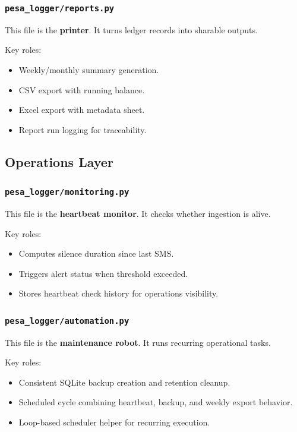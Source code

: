\documentclass[12pt,a4paper]{article}
\begin{document}
\subsubsection*{\texttt{pesa\_logger/reports.py}}
This file is the \textbf{printer}. It turns ledger records into sharable outputs.

Key roles:
\begin{itemize}[leftmargin=1.5em]
  \item Weekly/monthly summary generation.
  \item CSV export with running balance.
  \item Excel export with metadata sheet.
  \item Report run logging for traceability.
\end{itemize}

\subsection{Operations Layer}
\subsubsection*{\texttt{pesa\_logger/monitoring.py}}
This file is the \textbf{heartbeat monitor}. It checks whether ingestion is alive.

Key roles:
\begin{itemize}[leftmargin=1.5em]
  \item Computes silence duration since last SMS.
  \item Triggers alert status when threshold exceeded.
  \item Stores heartbeat check history for operations visibility.
\end{itemize}

\subsubsection*{\texttt{pesa\_logger/automation.py}}
This file is the \textbf{maintenance robot}. It runs recurring operational tasks.

Key roles:
\begin{itemize}[leftmargin=1.5em]
  \item Consistent SQLite backup creation and retention cleanup.
  \item Scheduled cycle combining heartbeat, backup, and weekly export behavior.
  \item Loop-based scheduler helper for recurring execution.
\end{itemize}
\end{document}
